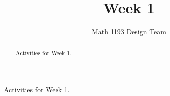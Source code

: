 \documentclass[noauthor]{ximera}
\title{Week 1}
\author{Math 1193 Design Team}
\begin{document}
\begin{abstract}
    Activities for Week 1.
\end{abstract}
\maketitle

Activities for Week 1.
\end{document}
